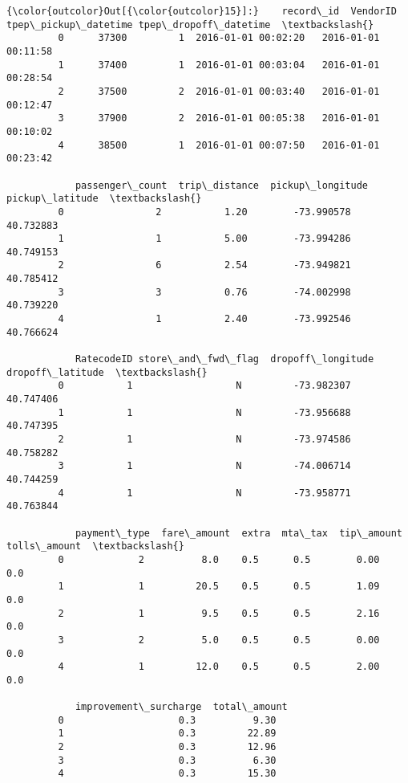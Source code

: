 \documentclass[11pt]{article}
\begin{document}
\begin{Verbatim}[commandchars=\\\{\}]
{\color{outcolor}Out[{\color{outcolor}15}]:}    record\_id  VendorID tpep\_pickup\_datetime tpep\_dropoff\_datetime  \textbackslash{}
         0      37300         1  2016-01-01 00:02:20   2016-01-01 00:11:58   
         1      37400         1  2016-01-01 00:03:04   2016-01-01 00:28:54   
         2      37500         2  2016-01-01 00:03:40   2016-01-01 00:12:47   
         3      37900         2  2016-01-01 00:05:38   2016-01-01 00:10:02   
         4      38500         1  2016-01-01 00:07:50   2016-01-01 00:23:42   
         
            passenger\_count  trip\_distance  pickup\_longitude  pickup\_latitude  \textbackslash{}
         0                2           1.20        -73.990578        40.732883   
         1                1           5.00        -73.994286        40.749153   
         2                6           2.54        -73.949821        40.785412   
         3                3           0.76        -74.002998        40.739220   
         4                1           2.40        -73.992546        40.766624   
         
            RatecodeID store\_and\_fwd\_flag  dropoff\_longitude  dropoff\_latitude  \textbackslash{}
         0           1                  N         -73.982307         40.747406   
         1           1                  N         -73.956688         40.747395   
         2           1                  N         -73.974586         40.758282   
         3           1                  N         -74.006714         40.744259   
         4           1                  N         -73.958771         40.763844   
         
            payment\_type  fare\_amount  extra  mta\_tax  tip\_amount  tolls\_amount  \textbackslash{}
         0             2          8.0    0.5      0.5        0.00           0.0   
         1             1         20.5    0.5      0.5        1.09           0.0   
         2             1          9.5    0.5      0.5        2.16           0.0   
         3             2          5.0    0.5      0.5        0.00           0.0   
         4             1         12.0    0.5      0.5        2.00           0.0   
         
            improvement\_surcharge  total\_amount  
         0                    0.3          9.30  
         1                    0.3         22.89  
         2                    0.3         12.96  
         3                    0.3          6.30  
         4                    0.3         15.30  
\end{Verbatim}
            
\end{document}
